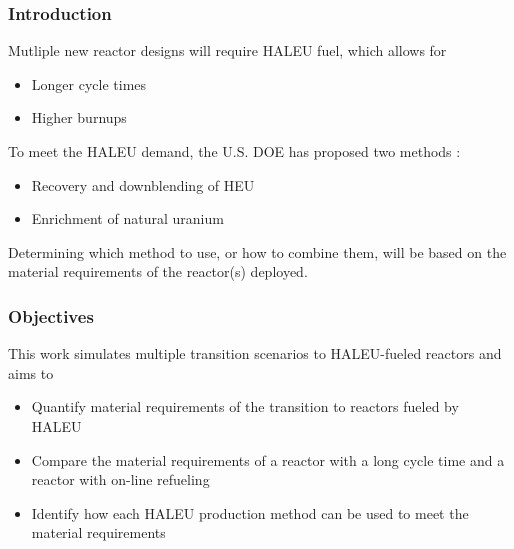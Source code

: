\begin{frame}
    \frametitle{Introduction}
    Mutliple new reactor designs will require \gls{HALEU} fuel, which allows for 
    \begin{itemize}
        \item Longer cycle times
        \item Higher burnups 
    \end{itemize}
    To meet the \gls{HALEU} demand, the U.S. \gls{DOE} has proposed two methods
    \cite{griffith_overview_2020}:
    \begin{itemize}
        \item Recovery and downblending of \gls{HEU}
        \item Enrichment of natural uranium
    \end{itemize}
    Determining which method to use, or how to combine them, will be based on 
    the material requirements of the reactor(s) deployed.

\end{frame}

\begin{frame}
    \frametitle{Objectives}
    This work simulates multiple transition scenarios to \gls{HALEU}-fueled 
    reactors and aims to 
    \begin{itemize}
        \item Quantify material requirements of the transition to reactors 
              fueled by \gls{HALEU}
        \item Compare the material requirements of a reactor with a long cycle 
              time and a reactor with on-line refueling
        \item Identify how each \gls{HALEU} production method can be used to 
              meet the material requirements
    \end{itemize}
\end{frame}